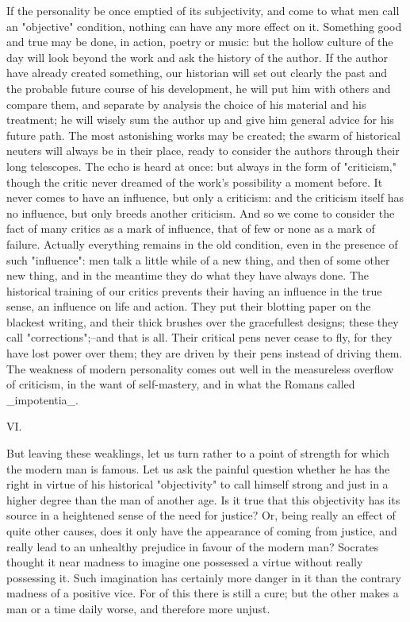 If the personality be once emptied of its subjectivity, and come to
what men call an "objective" condition, nothing can have any more
effect on it. Something good and true may be done, in action, poetry
or music: but the hollow culture of the day will look beyond the work
and ask the history of the author. If the author have already created
something, our historian will set out clearly the past and the
probable future course of his development, he will put him with
others and compare them, and separate by analysis the choice of his
material and his treatment; he will wisely sum the author up and give
him general advice for his future path. The most astonishing works
may be created; the swarm of historical neuters will always be in
their place, ready to consider the authors through their long
telescopes. The echo is heard at once: but always in the form of
"criticism," though the critic never dreamed of the work's
possibility a moment before. It never comes to have an influence, but
only a criticism: and the criticism itself has no influence, but only
breeds another criticism. And so we come to consider the fact of many
critics as a mark of influence, that of few or none as a mark of
failure. Actually everything remains in the old condition, even in
the presence of such "influence": men talk a little while of a new
thing, and then of some other new thing, and in the meantime they do
what they have always done. The historical training of our critics
prevents their having an influence in the true sense, an influence on
life and action. They put their blotting paper on the blackest
writing, and their thick brushes over the gracefullest designs; these
they call "corrections";--and that is all. Their critical pens never
cease to fly, for they have lost power over them; they are driven by
their pens instead of driving them. The weakness of modern
personality comes out well in the measureless overflow of criticism,
in the want of self-mastery, and in what the Romans called
_impotentia_.


VI.

But leaving these weaklings, let us turn rather to a point of
strength for which the modern man is famous. Let us ask the painful
question whether he has the right in virtue of his historical
"objectivity" to call himself strong and just in a higher degree than
the man of another age. Is it true that this objectivity has its
source in a heightened sense of the need for justice? Or, being
really an effect of quite other causes, does it only have the
appearance of coming from justice, and really lead to an unhealthy
prejudice in favour of the modern man? Socrates thought it near
madness to imagine one possessed a virtue without really possessing
it. Such imagination has certainly more danger in it than the
contrary madness of a positive vice. For of this there is still a
cure; but the other makes a man or a time daily worse, and therefore
more unjust.

